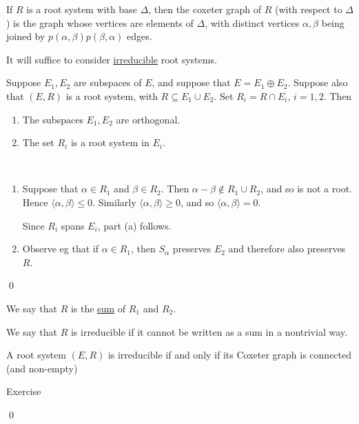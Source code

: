\documentclass[x11names,reqno,14pt]{extarticle}
\begin{document}
If $R$ is a root system with base $\Delta$, then the coxeter graph of $R$ (with respect to $\Delta$) is the graph whose vertices are elements of $\Delta$, with distinct vertices $\alpha,\beta$ being joined by $p(\alpha,\beta)p(\beta,\alpha)$ edges. 

It will suffice to consider \underline{irreducible} root systems. 

\prop

Suppose $E_1, E_2$ are subspaces of $E$, and suppose that $E = E_1 \oplus E_2$. Suppose also that $(E,R)$ is a root system, with $R \subseteq E_1 \cup E_2$. Set $R_i = R \cap E_i$, $i =1,2$. Then
\begin{enumerate}[label=(\alph*)]

\item The subspaces $E_1, E_2$ are orthogonal. 

\item The set $R_i$ is a root system in $E_i$. 

\end{enumerate}

\proof
\,
\begin{enumerate}[label=(\alph*)]

\item Suppose that $\alpha\in R_1$ and $\beta\in R_2$. Then $\alpha-\beta \not\in R_1 \cup R_2$, and so is not a root. Hence $\langle\alpha,\beta\rangle\leq0$. Similarly $\langle\alpha,\beta\rangle\geq0$, and so $\langle\alpha,\beta\rangle=0$. 

Since $R_i$ spans $E_i$, part (a) follows. 

\item Observe eg that if $\alpha \in R_1$, then $S_\alpha$ preserves $E_2$ and therefore also preserves $R$.

\end{enumerate}

\qed

We say that $R$ is the \underline{sum} of $R_1$ and $R_2$. 


We say that $R$ is irreducible if it cannot be written as a sum in a nontrivial way. 

\prop

A root system $(E,R)$ is irreducible if and only if its Coxeter graph is connected (and non-empty)

\proof

Exercise

\qed

\thm
\end{document}
